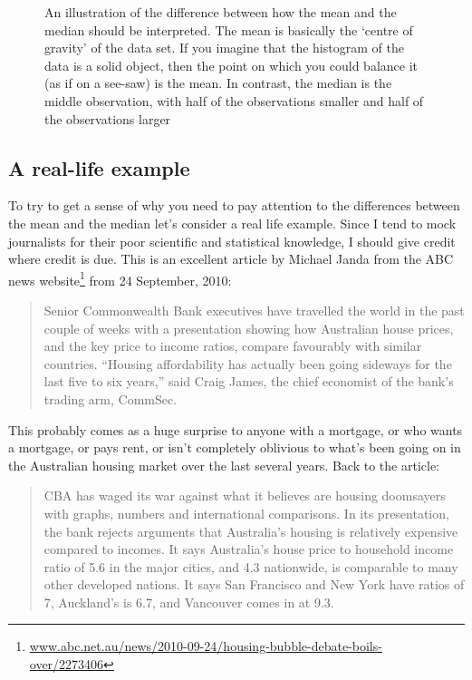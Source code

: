 \documentclass[
  a4paper,
]{book}
\begin{document}
\begin{figure}
\begin{minipage}[t]{0.52\linewidth}
{{}

}

\end{minipage}%

\caption{\label{fig-fig4-4}An illustration of the difference between how
the mean and the median should be interpreted. The mean is basically the
`centre of gravity' of the data set. If you imagine that the histogram
of the data is a solid object, then the point on which you could balance
it (as if on a see-saw) is the mean. In contrast, the median is the
middle observation, with half of the observations smaller and half of
the observations larger}

\end{figure}

\hypertarget{sec-A-real-life-example}{%
\subsection{A real-life example}\label{sec-A-real-life-example}}

To try to get a sense of why you need to pay attention to the
differences between the mean and the median let's consider a real life
example. Since I tend to mock journalists for their poor scientific and
statistical knowledge, I should give credit where credit is due. This is
an excellent article by Michael Janda from the ABC news
website\footnote{\url{www.abc.net.au/news/2010-09-24/housing-bubble-debate-boils-over/2273406}}
from 24 September, 2010:

\begin{quote}
Senior Commonwealth Bank executives have travelled the world in the past
couple of weeks with a presentation showing how Australian house prices,
and the key price to income ratios, compare favourably with similar
countries. ``Housing affordability has actually been going sideways for
the last five to six years,'' said Craig James, the chief economist of
the bank's trading arm, CommSec.
\end{quote}

This probably comes as a huge surprise to anyone with a mortgage, or who
wants a mortgage, or pays rent, or isn't completely oblivious to what's
been going on in the Australian housing market over the last several
years. Back to the article:

\begin{quote}
CBA has waged its war against what it believes are housing doomsayers
with graphs, numbers and international comparisons. In its presentation,
the bank rejects arguments that Australia's housing is relatively
expensive compared to incomes. It says Australia's house price to
household income ratio of 5.6 in the major cities, and 4.3 nationwide,
is comparable to many other developed nations. It says San Francisco and
New York have ratios of 7, Auckland's is 6.7, and Vancouver comes in at
9.3.
\end{quote}
\end{document}
